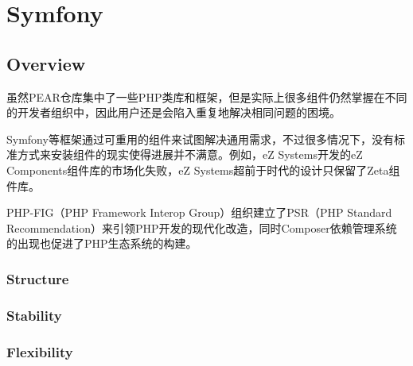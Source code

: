 \part{Symfony}

\chapter{Overview}


虽然PEAR仓库集中了一些PHP类库和框架，但是实际上很多组件仍然掌握在不同的开发者组织中，因此用户还是会陷入重复地解决相同问题的困境。

Symfony等框架通过可重用的组件来试图解决通用需求，不过很多情况下，没有标准方式来安装组件的现实使得进展并不满意。例如，eZ Systems开发的eZ Components组件库的市场化失败，eZ Systems超前于时代的设计只保留了Zeta组件库。

PHP-FIG（PHP Framework Interop Group）组织建立了PSR（PHP Standard Recommendation）来引领PHP开发的现代化改造，同时Composer依赖管理系统的出现也促进了PHP生态系统的构建。






\section{Structure}




\section{Stability}



\section{Flexibility}


